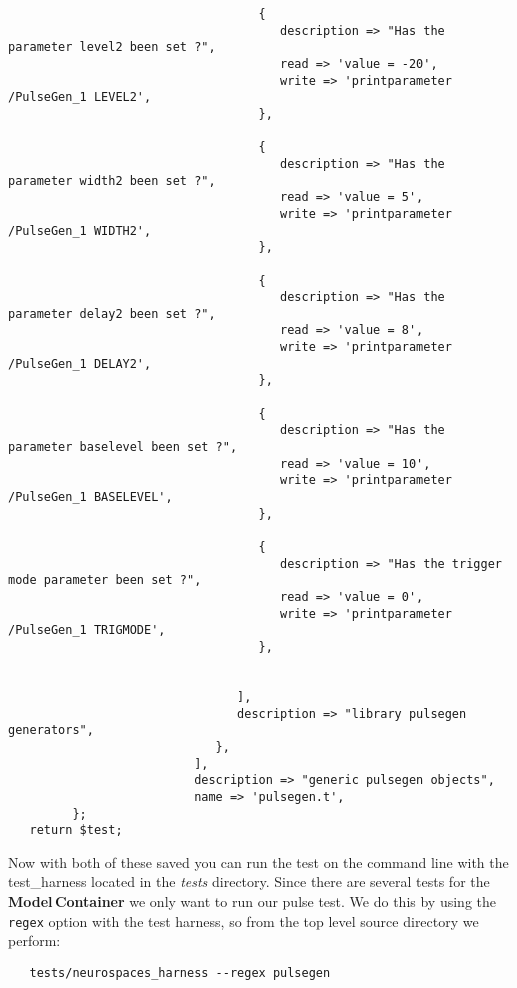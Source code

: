 \documentclass[12pt]{article}
\begin{document}
\begin{verbatim}
                                   {
                                      description => "Has the parameter level2 been set ?",
                                      read => 'value = -20',
                                      write => 'printparameter /PulseGen_1 LEVEL2',
                                   },

                                   {
                                      description => "Has the parameter width2 been set ?",
                                      read => 'value = 5',
                                      write => 'printparameter /PulseGen_1 WIDTH2',
                                   },

                                   {
                                      description => "Has the parameter delay2 been set ?",
                                      read => 'value = 8',
                                      write => 'printparameter /PulseGen_1 DELAY2',
                                   },

                                   {
                                      description => "Has the parameter baselevel been set ?",
                                      read => 'value = 10',
                                      write => 'printparameter /PulseGen_1 BASELEVEL',
                                   },

                                   {
                                      description => "Has the trigger mode parameter been set ?",
                                      read => 'value = 0',
                                      write => 'printparameter /PulseGen_1 TRIGMODE',
                                   },


                                ],
                                description => "library pulsegen generators",
                             },
                          ],
                          description => "generic pulsegen objects",
                          name => 'pulsegen.t',
         };
   return $test;
\end{verbatim}
Now with both of these saved you can run the test on the command line with the test\_harness located in the {\it tests} directory. Since there are several tests for the {\bf Model\,Container} we only want to run our pulse test. We do this by using the {\tt regex} option with the test harness, so from the top level source directory we perform:
\begin{verbatim}
   tests/neurospaces_harness --regex pulsegen
\end{verbatim}
\end{document}
